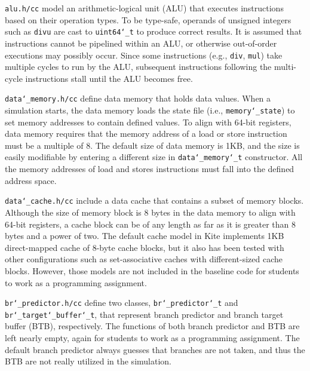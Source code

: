 \documentclass[10pt]{article}
\begin{document}
{\tt alu.h/cc} model an arithmetic-logical unit (ALU) that executes instructions based on their operation types.
To be type-safe, operands of unsigned integers such as {\tt divu} are cast to {\tt uint64\char`_t} to produce correct results.
It is assumed that instructions cannot be pipelined within an ALU, or otherwise out-of-order executions may possibly occur.
Since some instructions (e.g., {\tt div}, {\tt mul}) take multiple cycles to run by the ALU, subsequent instructions following the multi-cycle instructions stall until the ALU becomes free.

{\tt data\char`_memory.h/cc} define data memory that holds data values.
When a simulation starts, the data memory loads the state file (i.e., {\tt memory\char`_state}) to set memory addresses to contain defined values.
To align with 64-bit registers, data memory requires that the memory address of a load or store instruction must be a multiple of 8.
The default size of data memory is 1KB, and the size is easily modifiable by entering a different size in {\tt data\char`_memory\char`_t} constructor.
All the memory addresses of load and stores instructions must fall into the defined address space.

{\tt data\char`_cache.h/cc} include a data cache that contains a subset of memory blocks.
Although the size of memory block is 8 bytes in the data memory to align with 64-bit registers, a cache block can be of any length as far as it is greater than 8 bytes and a power of two.
The default cache model in Kite implements 1KB direct-mapped cache of 8-byte cache blocks, but it also has been tested with other configurations such as set-associative caches with different-sized cache blocks.
However, those models are not included in the baseline code for students to work as a programming assignment.

{\tt br\char`_predictor.h/cc} define two classes, {\tt br\char`_predictor\char`_t} and {\tt br\char`_target\char`_buffer\char`_t}, that represent branch predictor and branch target buffer (BTB), respectively.
The functions of both branch predictor and BTB are left nearly empty, again for students to work as a programming assignment.
The default branch predictor always guesses that branches are not taken, and thus the BTB are not really utilized in the simulation.
\end{document}
